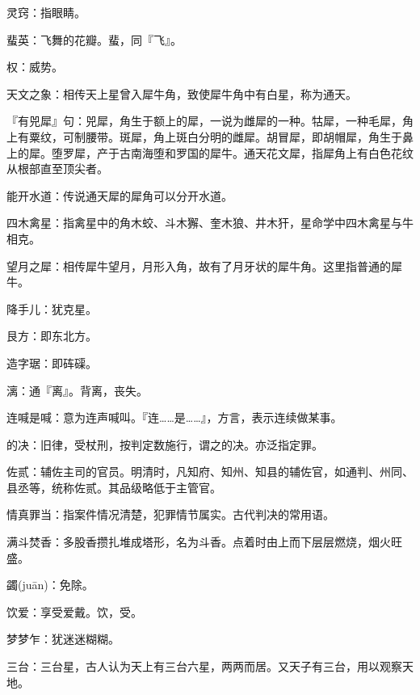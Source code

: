 \startbuffer[2351]
灵窍：指眼睛。
\stopbuffer


\startbuffer[2352]
蜚英：飞舞的花瓣。蜚，同『飞』。
\stopbuffer


\startbuffer[2353]
权：威势。
\stopbuffer


\startbuffer[2354]
天文之象：相传天上星曾入犀牛角，致使犀牛角中有白星，称为通天。
\stopbuffer


\startbuffer[2355]
『有兕犀』句：兕犀，角生于额上的犀，一说为雌犀的一种。牯犀，一种毛犀，角上有粟纹，可制腰带。斑犀，角上斑白分明的雌犀。胡冒犀，即胡帽犀，角生于鼻上的犀。堕罗犀，产于古南海堕和罗国的犀牛。通天花文犀，指犀角上有白色花纹从根部直至顶尖者。
\stopbuffer


\startbuffer[2356]
能开水道：传说通天犀的犀角可以分开水道。
\stopbuffer


\startbuffer[2357]
四木禽星：指禽星中的角木蛟、斗木獬、奎木狼、井木犴，星命学中四木禽星与牛相克。
\stopbuffer


\startbuffer[2358]
望月之犀：相传犀牛望月，月形入角，故有了月牙状的犀牛角。这里指普通的犀牛。
\stopbuffer


\startbuffer[2359]
降手儿：犹克星。
\stopbuffer


\startbuffer[2360]
艮方：即东北方。
\stopbuffer


\startbuffer[2361]
造字琚：即砗磲。
\stopbuffer


\startbuffer[2362]
漓：通『离』。背离，丧失。
\stopbuffer


\startbuffer[2363]
连喊是喊：意为连声喊叫。『连……是……』，方言，表示连续做某事。
\stopbuffer


\startbuffer[2364]
的决：旧律，受杖刑，按判定数施行，谓之的决。亦泛指定罪。
\stopbuffer


\startbuffer[2365]
佐贰：辅佐主司的官员。明清时，凡知府、知州、知县的辅佐官，如通判、州同、县丞等，统称佐贰。其品级略低于主管官。
\stopbuffer


\startbuffer[2366]
情真罪当：指案件情况清楚，犯罪情节属实。古代判决的常用语。
\stopbuffer


\startbuffer[2367]
满斗焚香：多股香攒扎堆成塔形，名为斗香。点着时由上而下层层燃烧，烟火旺盛。
\stopbuffer


\startbuffer[2368]
蠲(juān)：免除。
\stopbuffer


\startbuffer[2369]
饮爱：享受爱戴。饮，受。
\stopbuffer


\startbuffer[2370]
梦梦乍：犹迷迷糊糊。
\stopbuffer


\startbuffer[2371]
三台：三台星，古人认为天上有三台六星，两两而居。又天子有三台，用以观察天地。
\stopbuffer


